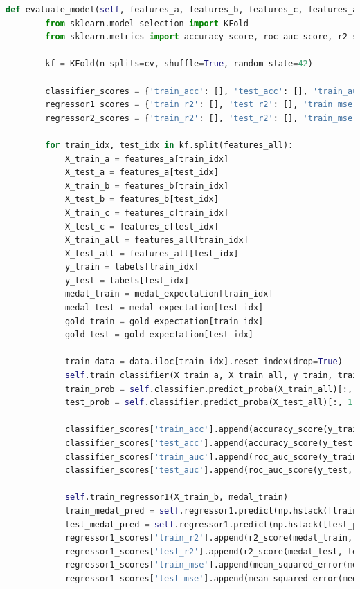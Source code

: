 \documentclass[12pt]{article}
\begin{document}
\begin{lstlisting}[language=Python, style=mystyle, caption=model.ipynb]
    def evaluate_model(self, features_a, features_b, features_c, features_all, labels, medal_expectation, gold_expectation, data, cv=5):
        from sklearn.model_selection import KFold 
        from sklearn.metrics import accuracy_score, roc_auc_score, r2_score, mean_squared_error
        
        kf = KFold(n_splits=cv, shuffle=True, random_state=42)
        
        classifier_scores = {'train_acc': [], 'test_acc': [], 'train_auc': [], 'test_auc': []}
        regressor1_scores = {'train_r2': [], 'test_r2': [], 'train_mse': [], 'test_mse': []}
        regressor2_scores = {'train_r2': [], 'test_r2': [], 'train_mse': [], 'test_mse': []}
        
        for train_idx, test_idx in kf.split(features_all):
            X_train_a = features_a[train_idx]
            X_test_a = features_a[test_idx] 
            X_train_b = features_b[train_idx]
            X_test_b = features_b[test_idx]
            X_train_c = features_c[train_idx]
            X_test_c = features_c[test_idx]
            X_train_all = features_all[train_idx]
            X_test_all = features_all[test_idx]
            y_train = labels[train_idx]
            y_test = labels[test_idx]
            medal_train = medal_expectation[train_idx]
            medal_test = medal_expectation[test_idx]
            gold_train = gold_expectation[train_idx]
            gold_test = gold_expectation[test_idx]
            
            train_data = data.iloc[train_idx].reset_index(drop=True)
            self.train_classifier(X_train_a, X_train_all, y_train, train_data)
            train_prob = self.classifier.predict_proba(X_train_all)[:, 1]
            test_prob = self.classifier.predict_proba(X_test_all)[:, 1]
            
            classifier_scores['train_acc'].append(accuracy_score(y_train, train_prob > 0.5))
            classifier_scores['test_acc'].append(accuracy_score(y_test, test_prob > 0.5))
            classifier_scores['train_auc'].append(roc_auc_score(y_train, train_prob))
            classifier_scores['test_auc'].append(roc_auc_score(y_test, test_prob))
            
            self.train_regressor1(X_train_b, medal_train)
            train_medal_pred = self.regressor1.predict(np.hstack([train_prob.reshape(-1, 1), X_train_b]))
            test_medal_pred = self.regressor1.predict(np.hstack([test_prob.reshape(-1, 1), X_test_b]))
            regressor1_scores['train_r2'].append(r2_score(medal_train, train_medal_pred))
            regressor1_scores['test_r2'].append(r2_score(medal_test, test_medal_pred))
            regressor1_scores['train_mse'].append(mean_squared_error(medal_train, train_medal_pred))
            regressor1_scores['test_mse'].append(mean_squared_error(medal_test, test_medal_pred))
            

\end{lstlisting}
\end{document}
